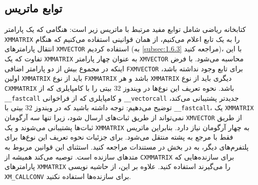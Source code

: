 \textbf{\vspace{-60pt}}

\subsection{\textbf{توابع ماتریس}}
\label{subsec:2.8.2}
{
    \Large
    \begin{spacing}{1.5}
        کتابخانه ریاضی  شامل توابع مفید مرتبط با ماتریس زیر است:
        \textbf{\vspace{6pt}}
        \lr{}
        \textbf{\vspace{6pt}}
        هنگامی که یک پارامتر \texttt{XMMATRIX} را به یک تابع اعلام می‌کنیم، از همان قوانینی استفاده می‌کنیم که هنگام انتقال پارامترهای \texttt{XMVECTOR} استفاده کردیم
        (به \ref{subsec:1.6.3} مراجعه کنید)،
        با این تفاوت که یک \texttt{XMMATRIX} به عنوان چهار پارامتر \texttt{XMVECTOR} محاسبه می‌شود.
        با فرض اینکه در مجموع بیش از دو پارامتر اضافی \texttt{FXMVECTOR} برای تابع وجود نداشته باشد،
        اولین \texttt{XMMATRIX} باید از نوع \texttt{FXMMATRIX} باشد و هر \texttt{XMMATRIX} دیگری باید از نوع \texttt{CXMMATRIX} باشد.
        نحوه تعریف این نوع‌ها در ویندوز $32$ بیتی را با کامپایلری که از \texttt{\_\_fastcall}
        و کامپایلری که از فراخوانی \texttt{\_\_vectorcall} جدیدتر پشتیبانی می‌کند، توضیح می‌دهیم:
        \textbf{\vspace{3pt}}
        \lr{}
        \textbf{\vspace{6pt}}
        توجه داشته باشید که در ویندوز $32$ بیتی با \texttt{\_\_fastcall}، یک \texttt{XMMATRIX} نمی‌تواند از طریق ثبات‌های  ارسال شود،
        زیرا تنها سه آرگومان \texttt{XMVECTOR} از طریق ثبات‌ها پشتیبانی می‌شوند و یک \texttt{XMMATRIX} به چهار آرگومان نیاز دارد.
        بنابراین ماتریس فقط با مرجع به پشته منتقل می‌شود.
        برای جزئیات نحوه تعریف این نوع‌ها برای پلتفرم‌های دیگر، به  در بخش  در مستندات  مراجعه کنید.
        استثنای این قوانین مربوط به متدهای سازنده است.
         توصیه می‌کند همیشه از \texttt{CXMMATRIX} برای سازنده‌هایی که پارامترهای \texttt{XMMATRIX} را می‌گیرند استفاده کنید.
        علاوه بر این، از حاشیه نویسی \texttt{XM\_CALLCONV} برای سازنده‌ها استفاده نکنید.
    \end{spacing}
}

